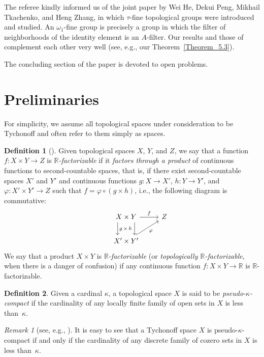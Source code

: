 \documentclass[a4paper,12pt]{amsart}
\theoremstyle{definition}
\newtheorem{definition}{Definition}[section]
\theoremstyle{remark}
\newtheorem{remark}{Remark}[section]
\begin{document}
The referee kindly informed us of the joint  paper \cite{HPTZ} by Wei He, Dekui Peng, Mikhail Tkachenko, and 
Heng Zhang, in which $\tau$-fine topological groups were introduced and studied. An $\omega_1$-fine group is 
precisely a group in which the filter of neighborhoods of the identity element is an $A$-filter. Our results and 
those of \cite{HPTZ} complement each other very well (see, e.g., our Theorem~\ref{Theorem_5.3}). 

The concluding section of the paper is devoted to open problems.

\section{Preliminaries} 

For simplicity, we assume all topological spaces under consideration to be Tychonoff and often refer to 
them simply as spaces.

\begin{definition}[\cite{R-S_2013, R_2024}]
\label{Definition_2.1}
Given topological spaces $X$, $Y$, and $Z$, we say that a function $f\colon X\times Y\to Z$ 
is \emph{$\mathbb R$-factorizable} if it \emph{factors through a product} of continuous functions to 
second-countable spaces, that is, if there exist second-countable spaces $X'$ and $Y'$ and continuous 
functions $g\colon X\to X'$, $h\colon Y\to Y'$, and $\varphi\colon X'\times Y'\to Z$ such that 
$f=\varphi\circ(g\times h)$, i.e., the following diagram 
is commutative: 
$$
\begin{tikzcd} 
&X\times Y\arrow[r, "f"] \arrow[d,shift left=12pt]\arrow[d,shift right=12pt,"\rlap{$g\,\times\, h$}"] & Z\\
&X'\times Y'\arrow[ru, "\varphi"']& 
\end{tikzcd} 
$$
We say that a product $X\times Y$ is \emph{$\mathbb R$-factorizable} 
(or \emph{topologically $\mathbb R$-fac\-tor\-iz\-able}, when there is a danger of confusion) 
if any continuous function $f\colon X\times Y \to \mathbb R$ is $\mathbb R$-factorizable. 
\end{definition} 

\begin{definition}
Given a cardinal $\kappa$, a topological space $X$ is said to be \emph{pseudo-$\kappa$-compact} if the 
cardinality of any locally finite family of open sets in $X$ is less than~$\kappa$. 
\end{definition}

\begin{remark}[{see, e.g., \cite{R-S_2025}}]
It is easy to see that a Tychonoff space $X$ is pseudo-$\kappa$-compact if and only if the cardinality of 
any discrete family of cozero sets in $X$ is less than~$\kappa$. 
\end{remark}
\end{document}
